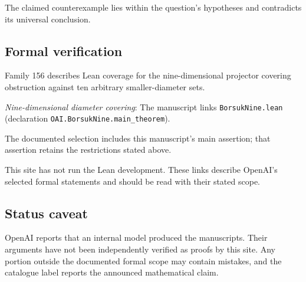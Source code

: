 \documentclass[11pt]{article}
\begin{document}
The claimed counterexample lies within the question’s hypotheses and contradicts its universal conclusion.

\subsection{Formal verification}
Family 156 describes Lean coverage for the nine-dimensional projector covering obstruction against ten arbitrary smaller-diameter sets.

\textit{Nine-dimensional diameter covering}: The manuscript links \texttt{BorsukNine.lean} (declaration \texttt{OAI.BorsukNine.main\_theorem}).

The documented selection includes this manuscript’s main assertion; that assertion retains the restrictions stated above.

This site has not run the Lean development. These links describe OpenAI’s selected formal statements and should be read with their stated scope.

\subsection{Status caveat}
OpenAI reports that an internal model produced the manuscripts. Their arguments have not been independently verified as proofs by this site. Any portion outside the documented formal scope may contain mistakes, and the catalogue label reports the announced mathematical claim.
\end{document}
